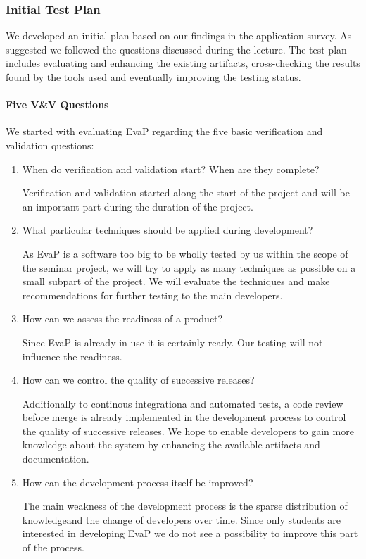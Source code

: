 \subsubsection{Initial Test Plan}
We developed an initial plan based on our findings in the application survey.
As suggested we followed the questions discussed during the lecture.
The test plan includes evaluating and enhancing the existing artifacts, cross-checking the results found by the tools used and eventually improving the testing status.

\paragraph{Five V\&V Questions}
We started with evaluating EvaP regarding the five basic verification and validation questions:
\begin{enumerate}
	\item When do verification and validation start? When are they complete?
    
    Verification and validation started along the start of the project and will be an important part during the duration of the project. 
	\item What particular techniques should be applied during development?
    
    As EvaP is a software too big to be wholly tested by us within the scope of the seminar project, we will try to apply as many techniques as possible on a small subpart of the project. We will evaluate the techniques and make recommendations for further testing to the main developers.
	\item How can we assess the readiness of a product?
    
    Since EvaP is already in use it is certainly ready. Our testing will not influence the readiness.
	\item How can we control the quality of successive releases?
    
    Additionally to continous integrationa and automated tests, a code review before merge is already implemented in the development process to control the quality of successive releases. We hope to enable developers to gain more knowledge about the system by enhancing the available artifacts and documentation.
	\item How can the development process itself be improved?
    
    The main weakness of the development process is the sparse distribution of knowledgeand the change of developers over time. Since only students are interested in developing EvaP we do not see a possibility to improve this part of the process.
\end{enumerate}


